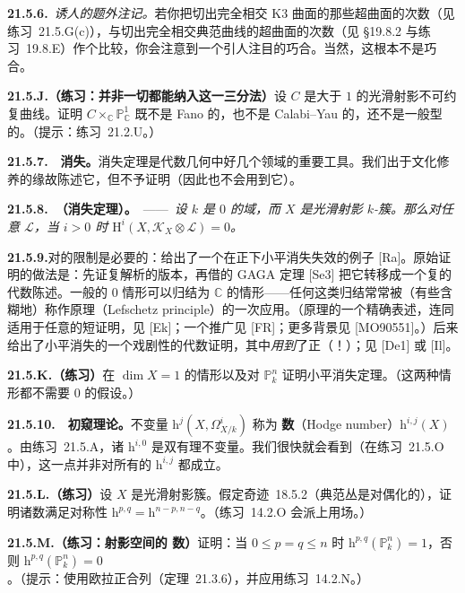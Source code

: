 \textbf{21.5.6.}\ \emph{诱人的题外注记。}\quad 若你把切出完全相交 K3 曲面的那些超曲面的次数（见\mbox{练习~21.5.G(c)}），与切出完全相交典范曲线的超曲面的次数（见 \S19.8.2 与\mbox{练习~19.8.E}）作个比较，你会注意到一个引人注目的巧合。当然，这根本不是巧合。

\textbf{21.5.J.（练习：并非一切都能纳入这一三分法）}\quad 设 $C$ 是\trGenus{}大于 $1$ 的光滑射影不可约复曲线。证明 $C\times_\mathbb{C}\mathbb{P}^1_\mathbb{C}$ 既不是 Fano 的，也不是 Calabi--Yau 的，还不是一般型的。（提示：\mbox{练习~21.2.U}。）

\textbf{21.5.7.}\ \hard\ \textbf{\trKodaira{}消失。}\quad \trKodaira{}消失定理是代数几何中好几个领域的重要工具。我们出于文化修养的缘故陈述它，但不予证明（因此也不会用到它）。

\textbf{21.5.8.\ \trhTheorem（\trKodaira{}消失定理）。}\ ——\ \emph{设 $k$ 是\trCharacteristic{} $0$ 的域，而 $X$ 是光滑射影 $k$-簇。那么对任意\trAmple{}\trInvertibleSheaf{} $\mathscr{L}$，当 $i>0$ 时 $\mathrm{H}^i(X,\mathscr{K}_X\otimes\mathscr{L})=0$。}

\textbf{21.5.9.}\quad 对\trCharacteristic{}的限制是必要的：\trRaynaud{}给出了一个在正\trCharacteristic{}下小平消失失效的例子 [Ra]。原始证明的做法是：先证复解析的版本，再借\trSerre{}的 GAGA 定理 [Se3] 把它转移成一个复的代数陈述。一般的\trCharacteristic{} $0$ 情形可以归结为 $\mathbb{C}$ 的情形——任何这类归结常常被（有些含糊地）称作\trLefschetz{}原理（Lefschetz principle）的一次应用。（\trLefschetz{}原理的一个精确表述，连同适用于任意\trCharacteristic{}的短证明，见 [Ek]；一个推广见 [FR]；更多背景见 [MO90551]。）\trRaynaud{}后来给出了小平消失的一个戏剧性的代数证明，其中\emph{用到}了正\trCharacteristic（！）；见 [De1] 或 [Il]。

\textbf{21.5.K.（练习）}\quad 在 $\dim X=1$ 的情形以及对 $\mathbb{P}^n_k$ 证明小平消失定理。（这两种情形都不需要\trCharacteristic{} $0$ 的假设。）

\textbf{21.5.10.}\ \hard\ \textbf{初窥\trHodge{}理论。}\quad 不变量 $\mathrm{h}^j(X,\Omega^i_{X/k})$ 称为 \textbf{\trHodge{}数}（Hodge number）$\mathrm{h}^{i,j}(X)$。由\mbox{练习~21.5.A}，诸 $\mathrm{h}^{i,0}$ 是双有理不变量。我们很快就会看到（在\mbox{练习~21.5.O} 中），这一点并非对所有的 $\mathrm{h}^{i,j}$ 都成立。

\textbf{21.5.L.（练习）}\quad 设 $X$ 是光滑射影簇。假定\mbox{奇迹~18.5.2}（典范丛是\trSerre{}对偶化的），证明诸\trHodge{}数满足对称性 $\mathrm{h}^{p,q}=\mathrm{h}^{n-p,n-q}$。（\mbox{练习~14.2.O} 会派上用场。）

\textbf{21.5.M.（练习：射影空间的 \trHodge{}数）}\quad 证明：当 $0\le p=q\le n$ 时 $\mathrm{h}^{p,q}(\mathbb{P}^n_k)=1$，否则 $\mathrm{h}^{p,q}(\mathbb{P}^n_k)=0$。（提示：使用欧拉正合列（\mbox{定理~21.3.6}），并应用\mbox{练习~14.2.N}。）

